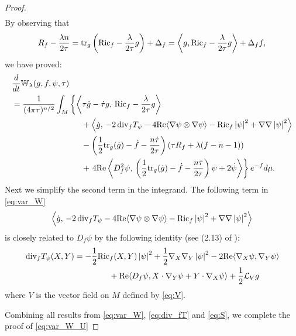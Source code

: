 \documentclass{amsart}
\theoremstyle{definition}
\theoremstyle{remark}
\numberwithin{equation}{section}
\newcommand{\abs}[1]{\left|#1\right|}
\newcommand{\tr}{\textup{tr}}
\newcommand{\Ric}{\textup{Ric}}
\renewcommand{\div}{\,\textup{div}}
\begin{document}
\begin{proof}
\begin{align}
\end{align}
By observing that
\[R_f - \frac{\lambda n}{2\tau} = \tr_g\left(\Ric_f - \frac{\lambda}{2\tau}g\right) + \Delta_f = \left\langle g, \Ric_f - \frac{\lambda}{2\tau}g\right\rangle + \Delta_f f,\]
we have proved:
\begin{align}
\label{eq:var_W}
& \frac{d}{dt}\mathbb{W}_\lambda(g,f,\psi,\tau)\\
&=  \frac{1}{(4\pi\tau)^{n/2}}\int_M \left\{ \left\langle \tau\dot{g} - \dot{\tau}g,\, \Ric_f - \frac{\lambda}{2\tau}g  \right\rangle \right.\nonumber\\
&\hskip 3cm + \left\langle \dot{g},\, -2\div_f T_\psi - 4\textup{Re}\langle\nabla\psi\otimes\nabla\psi\rangle  - \Ric_f \abs{\psi}^2 + \nabla\nabla\abs{\psi}^2  \right\rangle \nonumber\\
&\hskip 3cm -\left(\frac{1}{2}\tr_g(\dot{g}) - \dot{f} -  \frac{n\dot\tau}{2\tau}\right)\left(\tau R_f + \lambda(f-n-1)\right) \nonumber\\
&\hskip 3cm + \left.4\textup{Re} \left\langle D_f^2\psi,\, \left( \frac{1}{2}\tr_g(\dot{g}) - \dot{f} - \frac{n\dot\tau}{2\tau}\right)\psi + 2\dot{\psi} \right\rangle  \right\}  e^{-f} d\mu. \nonumber
\end{align}
Next we simplify the second term in the integrand. The following term in \eqref{eq:var_W}
\[\left\langle \dot{g},\, -2\div_f T_\psi - 4\textup{Re}\langle\nabla\psi\otimes\nabla\psi\rangle  - \Ric_f \abs{\psi}^2 + \nabla\nabla\abs{\psi}^2  \right\rangle\]
is closely related to $D_f\psi$ by the following identity (see (2.13) of \cite{BO23}):
\begin{align}
\label{eq:div_fT}
\div_fT_\psi (X,Y) & =	 -\frac{1}{2}\Ric_f(X,Y)\abs{\psi}^2 + \frac{1}{2}\nabla_X\nabla_Y\abs{\psi}^2 - 2\textup{Re}\langle \nabla_X \psi, \nabla_Y \psi\rangle\\
& \hskip 1.5cm +\textup{Re}\langle D_f\psi, X \cdot \nabla_Y \psi + Y \cdot \nabla_X \psi\rangle + \frac{1}{2}\mathcal{L}_V g \nonumber
\end{align}
where $V$ is the vector field on $M$ defined by \eqref{eq:V}.

Combining all results from \eqref{eq:var_W}, \eqref{eq:div_fT} and \eqref{eq:S}, we complete the proof of \eqref{eq:var_W_U}
\end{proof}
\end{document}
